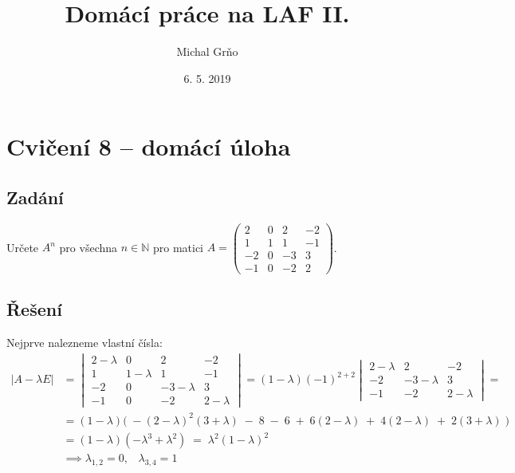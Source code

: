 \documentclass[]{article}
\title{Domácí práce na LAF II.}
\date{6. 5. 2019}
\author{Michal Grňo}
\begin{document}
\maketitle

\begingroup
\addtolength{\jot}{1em}

\section{Cvičení 8 – domácí úloha}

\subsection{Zadání}
Určete $A^n$ pro všechna $n \in \mathbb{N}$ pro matici \(A = \begin{pmatrix}
    2 & 0 & 2 & -2 \\
    1 & 1 & 1 & -1 \\
    -2 & 0 & -3 & 3 \\
    -1 & 0 & -2 & 2
\end{pmatrix} \).

\subsection{Řešení}
Nejprve nalezneme vlastní čísla:
\begin{align*}
    | A - \lambda E |
    &=  \begin{vmatrix}
        2 - \lambda & 0 & 2 & -2 \\
        1 & 1 - \lambda & 1 & -1 \\
        -2 & 0 & -3-\lambda & 3 \\
        -1 & 0 & -2 & 2-\lambda
    \end{vmatrix}
    = (1 - \lambda) (-1)^{2+2} \begin{vmatrix}
        2-\lambda & 2 & -2 \\
        -2 & -3-\lambda & 3 \\
        -1 & -2 & 2-\lambda
    \end{vmatrix}
    = \\
    &= (1-\lambda)\big(\;
        -(2-\lambda)^2 (3+\lambda) \; - \; 8 \; - \; 6 \;
        + \; 6 (2-\lambda) \; + \; 4 (2-\lambda) \; + \; 2 (3+\lambda)
    \;\big) \\
    &= (1-\lambda)( -\lambda^3 + \lambda^2 ) \; = \; \lambda^2 (1-\lambda)^2 \\
    &\implies \lambda_{1,2} = 0, \;\;\; \lambda_{3,4} = 1
\end{align*}
\end{document}
